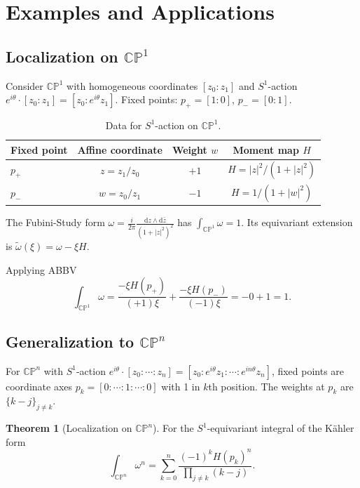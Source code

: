 \documentclass[10pt]{article}
\theoremstyle{definition}
\newtheorem{theorem}[definition]{Theorem}
\newcommand{\diff}{\mathrm{d}}
\newcommand{\CP}{\mathbb{CP}}
\newcommand{\sone}{S^{1}}
\begin{document}
\section{Examples and Applications}\label{sec:examples}
\subsection{Localization on $\mathbb{CP}^1$}\label{subsec:cp1}
Consider $\CP^1$ with homogeneous coordinates $[z_0:z_1]$ and $\sone$-action $e^{i\theta}\cdot[z_0:z_1] = [z_0:e^{i\theta}z_1]$. Fixed points: $p_+=[1:0]$, $p_-=[0:1]$.

\begin{table}[ht]
\centering
\begin{tabular}{l c c c}
\toprule
Fixed point & Affine coordinate & Weight $w$ & Moment map $H$ \\
\midrule
$p_+$ & $z = z_1/z_0$ & $+1$ & $H = |z|^2/(1+|z|^2)$ \\
$p_-$ & $w = z_0/z_1$ & $-1$ & $H = 1/(1+|w|^2)$ \\
\bottomrule
\end{tabular}
\caption{Data for $\sone$-action on $\CP^1$.}
\label{tab:cp1-data}
\end{table}

The Fubini-Study form $\omega = \frac{i}{2\pi} \frac{\diff z \wedge \diff\bar{z}}{(1+|z|^2)^2}$ has $\int_{\CP^1} \omega = 1$. Its equivariant extension is $\tilde{\omega}(\xi) = \omega - \xi H$.

Applying ABBV
\begin{equation}
\int_{\CP^1} \omega = \frac{-\xi H(p_+)}{(+1)\xi} + \frac{-\xi H(p_-)}{(-1)\xi} = -0 + 1 = 1.
\end{equation}

\subsection{Generalization to $\mathbb{CP}^n$}\label{subsec:cpn}
For $\CP^n$ with $\sone$-action $e^{i\theta}\cdot[z_0:\cdots:z_n] = [z_0:e^{i\theta}z_1:\cdots:e^{in\theta}z_n]$, fixed points are coordinate axes $p_k = [0:\cdots:1:\cdots:0]$ with 1 in $k$th position. The weights at $p_k$ are $\{k-j\}_{j\neq k}$.

\begin{theorem}[Localization on $\CP^n$]
For the $\sone$-equivariant integral of the K\"ahler form
\begin{equation}
\int_{\CP^n} \omega^n = \sum_{k=0}^n \frac{(-1)^k H(p_k)^n}{\prod_{j\neq k} (k-j)}.
\end{equation}
\end{theorem}
\end{document}
